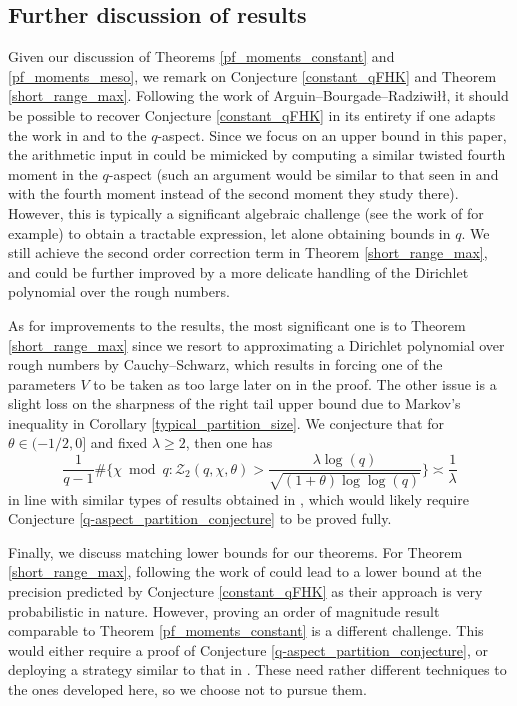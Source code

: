 \documentclass[reqno]{amsart}
\theoremstyle{definition}
\theoremstyle{remark}
\numberwithin{equation}{section}
\theoremstyle{remark}
\begin{document}
\subsection{Further discussion of results} \label{further_disc}
Given our discussion of Theorems \ref{pf_moments_constant} and \ref{pf_moments_meso}, we remark on Conjecture \ref{constant_qFHK} and Theorem \ref{short_range_max}. Following the work of Arguin--Bourgade--Radziwi\l{}\l{}, it should be possible to recover Conjecture \ref{constant_qFHK} in its entirety if one adapts the work in \cite{abr20} and \cite{abr23} to the $q$-aspect. Since we focus on an upper bound in this paper, the arithmetic input in \cite{abr20} could be mimicked by computing a similar twisted fourth moment in the $q$-aspect (such an argument would be similar to that seen in \cite{ac25} and \cite{creighton25} with the fourth moment instead of the second moment they study there). However, this is typically a significant algebraic challenge (see the work of \cite{gz25twisted} for example) to obtain a tractable expression, let alone obtaining bounds in $q$. We still achieve the second order correction term in Theorem \ref{short_range_max}, and could be further improved by a more delicate handling of the Dirichlet polynomial over the rough numbers. \par
As for improvements to the results, the most significant one is to Theorem \ref{short_range_max} since we resort to approximating a Dirichlet polynomial over rough numbers by Cauchy--Schwarz, which results in forcing one of the parameters $V$ to be taken as too large later on in the proof. The other issue is a slight loss on the sharpness of the right tail upper bound due to Markov's inequality in Corollary \ref{typical_partition_size}. We conjecture that for $\theta \in (-1/2,0]$ and fixed $\lambda \geq 2$, then one has
$$\frac{1}{q-1}\# \big\{\chi \bmod{q}: \mathcal{Z}_2(q,\chi,\theta) > \frac{\lambda \log(q)}{\sqrt{(1+\theta)\log\log(q)}}\big\} \asymp \frac{1}{\lambda}$$
in line with similar types of results obtained in \cite{barral15}, which would likely require Conjecture \ref{q-aspect_partition_conjecture} to be proved fully. \par
Finally, we discuss matching lower bounds for our theorems. For Theorem \ref{short_range_max}, following the work of \cite{abr23} could lead to a lower bound at the precision predicted by Conjecture \ref{constant_qFHK} as their approach is very probabilistic in nature. However, proving an order of magnitude result comparable to Theorem \ref{pf_moments_constant} is a different challenge. This would either require a proof of Conjecture \ref{q-aspect_partition_conjecture}, or deploying a strategy similar to that in \cite{harper26}. These need rather different techniques to the ones developed here, so we choose not to pursue them.
\end{document}

